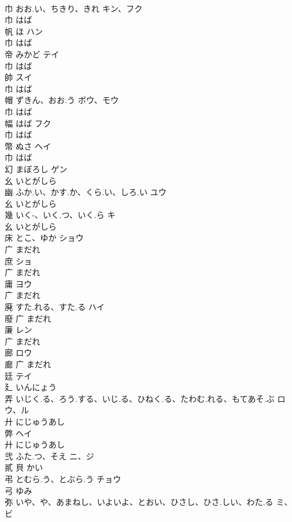 \documentclass[8pt]{extreport}
\begin{document}
\begin{CJK}{UTF8}{min}
\\	巾	おお.い、ちきり、きれ	キン、フク	
\\	巾		はば		
\\	帆	ほ	ハン	
\\	巾		はば		
\\	帝	みかど	テイ	
\\	巾		はば		
\\	帥		スイ	
\\	巾		はば		
\\	帽	ずきん、おお.う	ボウ、モウ	
\\	巾		はば		
\\	幅	はば	フク	
\\	巾		はば		
\\	幣	ぬさ	ヘイ	
\\	巾		はば		
\\	幻	まぼろし	ゲン	
\\	幺		いとがしら		
\\	幽	ふか.い、かす.か、くら.い、しろ.い	ユウ	
\\	幺		いとがしら		
\\	幾	いく-、いく.つ、いく.ら	キ	
\\	幺		いとがしら		
\\	床	とこ、ゆか	ショウ	
\\	广		まだれ		
\\	庶		ショ	
\\	广		まだれ		
\\	庸		ヨウ	
\\	广		まだれ		
\\	廃	すた.れる、すた.る	ハイ	
\\	廢	广		まだれ		
\\	廉		レン	
\\	广		まだれ		
\\	廊		ロウ	
\\	廊	广		まだれ		
\\	廷		テイ	
\\	廴		いんにょう		
\\	弄	いじく.る、ろう.する、いじ.る、ひねく.る、たわむ.れる、もてあそ.ぶ	ロウ、ル	
\\	廾		にじゅうあし		
\\	弊		ヘイ	
\\	廾		にじゅうあし		
\\	弐	ふた.つ、そえ	ニ、ジ	
\\	貳	貝		かい		
\\	弔	とむら.う、とぶら.う	チョウ	
\\	弓		ゆみ		
\\	弥	いや、や、あまねし、いよいよ、とおい、ひさし、ひさ.しい、わた.る	ミ、ビ	

\end{CJK}
\end{document}
